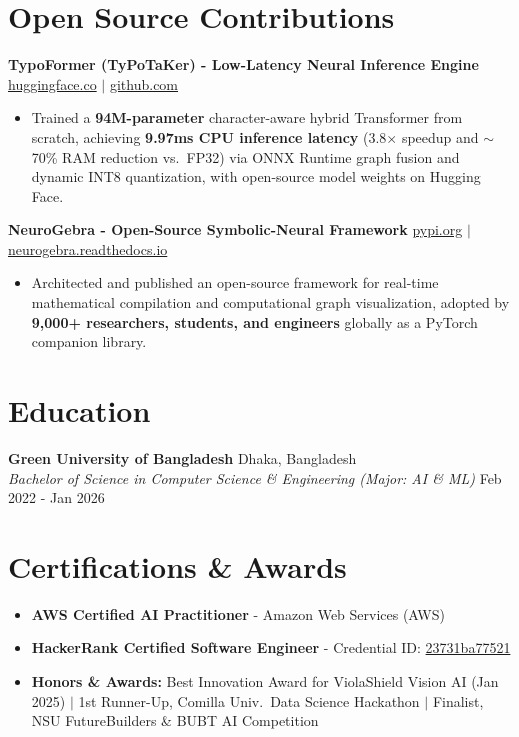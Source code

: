 \documentclass[9.5pt,a4paper]{article}
\begin{document}
\section*{Open Source Contributions}
\noindent
\textbf{TypoFormer (TyPoTaKer) - Low-Latency Neural Inference Engine} \hfill \href{https://huggingface.co/fahiiim/TypoFormer}{huggingface.co} $\vert$ \href{https://github.com/fahiiim/TyPoTaKer}{github.com}
\begin{itemize}
    \item Trained a \textbf{94M-parameter} character-aware hybrid Transformer from scratch, achieving \textbf{9.97ms CPU inference latency} (3.8$\times$ speedup and $\sim$70\% RAM reduction vs.\ FP32) via ONNX Runtime graph fusion and dynamic INT8 quantization, with open-source model weights on Hugging Face.
\end{itemize}
\vspace{0.6pt}
\noindent
\textbf{NeuroGebra - Open-Source Symbolic-Neural Framework} \hfill \href{https://pypi.org/project/neurogebra/}{pypi.org} $\vert$ \href{https://neurogebra.readthedocs.io}{neurogebra.readthedocs.io}
\begin{itemize}
    \item Architected and published an open-source framework for real-time mathematical compilation and computational graph visualization, adopted by \textbf{9,000+ researchers, students, and engineers} globally as a PyTorch companion library.
\end{itemize}
\vspace{0.6pt}

\section*{Education}
\noindent
\textbf{Green University of Bangladesh} \hfill Dhaka, Bangladesh\\
\textit{Bachelor of Science in Computer Science \& Engineering (Major: AI \& ML)} \hfill Feb 2022 - Jan 2026

\section*{Certifications \& Awards}
\begin{itemize}
    \item \textbf{AWS Certified AI Practitioner} - Amazon Web Services (AWS)
    \item \textbf{HackerRank Certified Software Engineer} - Credential ID: \href{https://www.hackerrank.com/certificates/23731ba77521}{23731ba77521}
    \item \textbf{Honors \& Awards:} Best Innovation Award for ViolaShield Vision AI (Jan 2025) $\vert$ 1st Runner-Up, Comilla Univ.\ Data Science Hackathon $\vert$ Finalist, NSU FutureBuilders \& BUBT AI Competition
\end{itemize}
\end{document}
